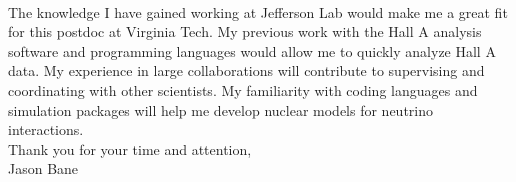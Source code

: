 \paragraph{}The knowledge I have gained working at Jefferson Lab would make me a great fit for this postdoc at Virginia Tech. My previous work with the Hall A analysis software and programming languages would allow me to quickly analyze Hall A data. My experience in large collaborations will  contribute to supervising and coordinating with other scientists. My familiarity with coding languages and simulation packages will help me develop nuclear models for neutrino interactions.\\


\noindent Thank you for your time and attention,\\
\noindent Jason Bane
